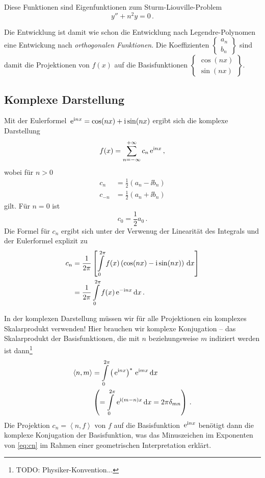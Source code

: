 \documentclass[paper=a4, fontsize=11.0pt, abstractoff, DIV12]{scrartcl}
\begin{document}
Diese Funktionen sind Eigenfunktionen zum Sturm-Liouville-Problem
\begin{equation*}
y'' + n^2 y = 0\,.
\end{equation*}

Die Entwicklung ist damit wie schon die Entwicklung nach Legendre-Polynomen
eine Entwickung nach \emph{orthogonalen Funktionen}. Die Koeffizienten
$\left\{\begin{array}{c}a_n\\b_n\end{array}\right\}$ sind damit die
Projektionen von $f(x)$ auf die Basisfunktionen
$\left\{\begin{array}{c}\cos(nx)\\\sin(nx)\end{array}\right\}$.

\subsection{Komplexe Darstellung}

Mit der Eulerformel $\,{\mathrm{e}}^{\mathrm{i} nx} = \cos(nx)+\mathrm{i}\sin(nx)$ ergibt sich die
komplexe Darstellung
\begin{equation}
f(x) = \sum\limits_{n=-\infty}^{+\infty}c_n\,{\mathrm{e}}^{\mathrm{i} nx}\,,
\end{equation}
wobei für $n> 0$
\begin{align}
c_n &= \frac{1}{2}(a_n - \ii b_n)\\
c_{-n} &= \frac{1}{2}(a_n + \ii b_n)
\end{align}
gilt. Für $n=0$ ist
\begin{equation}
c_0 = \frac{1}{2}a_0\,.
\end{equation}
Die Formel für $c_n$ ergibt sich unter der Verwenug der Linearität des
Integrals und der Eulerformel explizit zu
\begin{align}
c_n &= \frac{1}{2\pi}\left[ \int\limits_{0}^{2\pi} f(x)\left(\cos(nx) - \mathrm{i} \sin(nx)\right)\,\mathrm{d} x\right]\nonumber\\
&=\frac{1}{2\pi}\int\limits_{0}^{2\pi} f(x) \,{\mathrm{e}}^{-\mathrm{i} nx}\,\mathrm{d} x\, .
\label{eq:cn}
\end{align}

\Stopsign\hspace{1ex}In der komplexen Darstellung müssen wir für alle
Projektionen ein komplexes Skalarprodukt verwenden! Hier brauchen wir
komplexe Konjugation -- das Skalarprodukt der Basisfunktionen, die mit $n$
beziehungsweise $m$ indiziert werden ist dann\footnote{TODO: Physiker-Konvention...}
\begin{align}
\left<n,m\right> &= \int\limits_{0}^{2\pi}\left(\,{\mathrm{e}}^{\mathrm{i} nx}\right)^*\,{\mathrm{e}}^{\mathrm{i} mx} \,\mathrm{d} x\\
& \left( =  \int\limits_{0}^{2\pi} \,{\mathrm{e}}^{\mathrm{i} (m-n)x}\,\mathrm{d} x = 2\pi \delta_{mn}\right)\,.\nonumber
\end{align}
Die Projektion $c_n = \left<n,f\right>$ von $f$ auf die Basisfunktion
$\,{\mathrm{e}}^{\mathrm{i} n x}$ benötigt dann die komplexe Konjugation der Basisfunktion,
was das Minuszeichen im Exponenten von \eqref{eq:cn} im Rahmen einer
geometrischen Interpretation erklärt.
\end{document}
